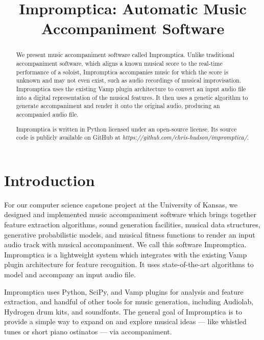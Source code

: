 \documentclass[11pt,conference,letterpaper]{IEEEtran}
\begin{document}
\title{Impromptica: Automatic Music Accompaniment Software}
\author{}

\maketitle

\begin{abstract}
We present music accompaniment software called Impromptica. Unlike traditional accompaniment software, which aligns a known musical score to the real-time performance of a soloist, Impromptica accompanies music for which the score is unknown and may not even exist, such as audio recordings of musical improvisation. Impromptica uses the existing Vamp plugin architecture to convert an input audio file into a digital representation of the musical features. It then uses a genetic algorithm to generate accompaniment and render it onto the original audio, producing an accompanied audio file.

Impromptica is written in Python licensed under an open-source license. Its source code is publicly available on GitHub at \emph{https://github.com/chris-hudson/impromptica/}.


\end{abstract}

\section{Introduction}

For our computer science capstone project at the University of Kansas, we designed and implemented music accompaniment software which brings together feature extraction algorithms, sound generation facilities, musical data structures, generative probabilistic models, and musical fitness functions to render an input audio track with musical accompaniment. We call this software Impromptica. Impromptica is a lightweight system which integrates with the existing Vamp plugin architecture for feature recognition. It uses state-of-the-art algorithms to model and accompany an input audio file.

Impromptica uses Python, SciPy, and Vamp plugins for analysis and feature extraction, and handful of other tools for music generation, including Audiolab, Hydrogen drum kits, and soundfonts. The general goal of Impromptica is to provide a simple way to expand on and explore musical ideas --- like whistled tunes or short piano ostinatos --- via accompaniment.
\end{document}
